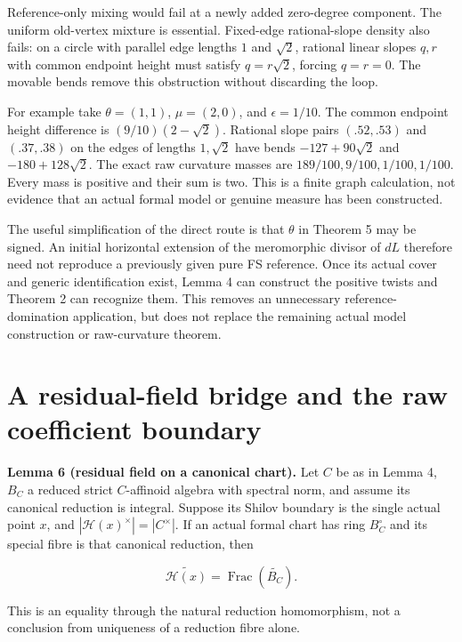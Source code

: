 \documentclass[
  11pt,
]{article}
\begin{document}
Reference-only mixing would fail at a newly added zero-degree component.
The uniform old-vertex mixture is essential. Fixed-edge rational-slope
density also fails: on a circle with parallel edge lengths \(1\) and
\(\sqrt2\), rational linear slopes \(q,r\) with common endpoint height
must satisfy \(q=r\sqrt2\), forcing \(q=r=0\). The movable bends remove
this obstruction without discarding the loop.

For example take \(\theta=(1,1)\), \(\mu=(2,0)\), and \(\epsilon=1/10\).
The common endpoint height difference is \((9/10)(2-\sqrt2)\). Rational
slope pairs \((.52,.53)\) and \((.37,.38)\) on the edges of lengths
\(1,\sqrt2\) have bends \(-127+90\sqrt2\) and \(-180+128\sqrt2\). The
exact raw curvature masses are \(189/100,9/100,1/100,1/100\). Every mass
is positive and their sum is two. This is a finite graph calculation,
not evidence that an actual formal model or genuine measure has been
constructed.

The useful simplification of the direct route is that \(\theta\) in
Theorem 5 may be signed. An initial horizontal extension of the
meromorphic divisor of \(dL\) therefore need not reproduce a previously
given pure FS reference. Once its actual cover and generic
identification exist, Lemma 4 can construct the positive twists and
Theorem 2 can recognize them. This removes an unnecessary
reference-domination application, but does not replace the remaining
actual model construction or raw-curvature theorem.

\section{A residual-field bridge and the raw coefficient
boundary}\label{a-residual-field-bridge-and-the-raw-coefficient-boundary}

\textbf{Lemma 6 (residual field on a canonical chart).} Let \(C\) be as
in Lemma 4, \(B_C\) a reduced strict \(C\)-affinoid algebra with
spectral norm, and assume its canonical reduction is integral. Suppose
its Shilov boundary is the single actual point \(x\), and
\(|\mathcal H(x)^\times|=|C^\times|\). If an actual formal chart has
ring \(B_C^\circ\) and its special fibre is that canonical reduction,
then

\[
 \widetilde{\mathcal H(x)}=\operatorname{Frac}(\widetilde {B_C}).
\]

This is an equality through the natural reduction homomorphism, not a
conclusion from uniqueness of a reduction fibre alone.
\end{document}
